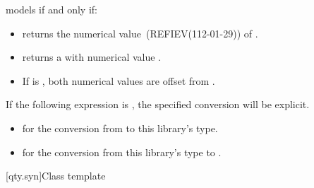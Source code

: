 \pnum
{} models  if and only if:
\begin{itemize}
\item
{} returns the numerical value~(REFIEV(112-01-29)) of .
\item
{} returns a  with numerical value .
\item
If  is ,
both numerical values are offset from .
\end{itemize}

\pnum
If the following expression is , the specified conversion will be explicit.
\begin{itemize}
\item
{} for the conversion from  to this library's type.
\item
{} for the conversion from this library's type to .
\end{itemize}

[qty.syn]{Class template }

